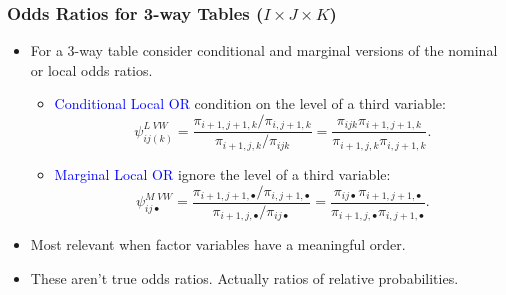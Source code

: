 \documentclass[oneside]{book}\usepackage[]{graphicx}\usepackage[svgnames]{xcolor}
\begin{document}
\subsubsection*{Odds Ratios for 3-way Tables ($ I\times J\times K $)}
\begin{itemize}
    \item For a 3-way table consider conditional and marginal versions of the nominal or
          local odds ratios.
          \begin{itemize}
              \item \textcolor{Blue}{Conditional Local OR} condition on the level of a third variable:
                    \[ \psi_{ij(k)}^{L\;VW}=\frac{\pi_{i+1,j+1,k}/\pi_{i,j+1,k}}{\pi_{i+1,j,k}/\pi_{ijk}}=\frac{\pi_{ijk}\pi_{i+1,j+1,k}}{\pi_{i+1,j,k}\pi_{i,j+1,k}}. \]
              \item \textcolor{Blue}{Marginal Local OR} ignore the level of a third variable:
                    \[ \psi_{ij\bullet}^{M\;VW}
                        =\frac{\pi_{i+1,j+1,\bullet}/\pi_{i,j+1,\bullet}}{\pi_{i+1,j,\bullet}/\pi_{ij\bullet}}
                        =\frac{\pi_{ij\bullet}\pi_{i+1,j+1,\bullet}}{\pi_{i+1,j,\bullet}\pi_{i,j+1,\bullet}}. \]
          \end{itemize}
    \item Most relevant when factor variables have a meaningful order.
    \item These aren't true odds ratios. Actually ratios of relative probabilities.
\end{itemize}
\end{document}
